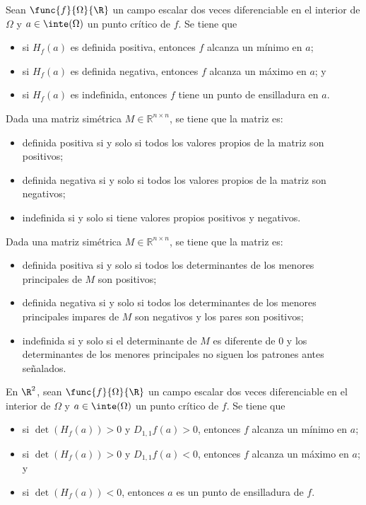 \documentclass[a4,11pt]{aleph-notas}
\begin{document}
\begin{teo}
    Sean $\func{f}{\Omega}{\R}$ un campo escalar dos veces diferenciable en el interior de $\Omega$ y $a\in\inte(\Omega)$ un punto crítico de $f$. Se tiene que
    \begin{itemize}
        \item si $H_f(a)$ es definida positiva, entonces $f$ alcanza un mínimo en $a$;
        \item si $H_f(a)$ es definida negativa, entonces $f$ alcanza un máximo en $a$; y
        \item si $H_f(a)$ es indefinida, entonces $f$ tiene un punto de ensilladura en $a$.
    \end{itemize}
\end{teo}

\begin{prop}
    Dada una matriz simétrica $M\in \mathbb{R}^{n\times n}$, se tiene que la matriz es:
    \begin{itemize}
        \item definida positiva si y solo si todos los valores propios de la matriz son positivos;
        \item definida negativa si y solo si todos los valores propios de la matriz son negativos;
        \item indefinida si y solo si tiene valores propios positivos y negativos.
    \end{itemize}
\end{prop}

\begin{prop}
    Dada una matriz simétrica $M\in \mathbb{R}^{n\times n}$, se tiene que la matriz es:
    \begin{itemize}
        \item definida positiva si y solo si todos los determinantes de los menores principales de $M$ son positivos;
        \item definida negativa si y solo si todos los determinantes de los menores principales impares de $M$ son negativos y los pares son positivos;
        \item indefinida si y solo si el determinante de $M$ es diferente de 0 y los determinantes de los menores principales no siguen los patrones antes señalados.
    \end{itemize}
\end{prop}

\begin{teo}
    En $\R^2$, sean $\func{f}{\Omega}{\R}$ un campo escalar dos veces diferenciable en el interior de $\Omega$ y $a\in\inte(\Omega)$ un punto crítico de $f$. Se tiene que
    \begin{itemize}
        \item si $\det(H_f(a))>0$ y $D_{1,1}f(a)>0$, entonces $f$ alcanza un mínimo en $a$;
        \item si $\det(H_f(a))>0$ y $D_{1,1}f(a)<0$, entonces $f$ alcanza un máximo en $a$; y
        \item si $\det(H_f(a))<0$, entonces $a$ es un punto de ensilladura de $f$.
    \end{itemize}
\end{teo}
\end{document}
